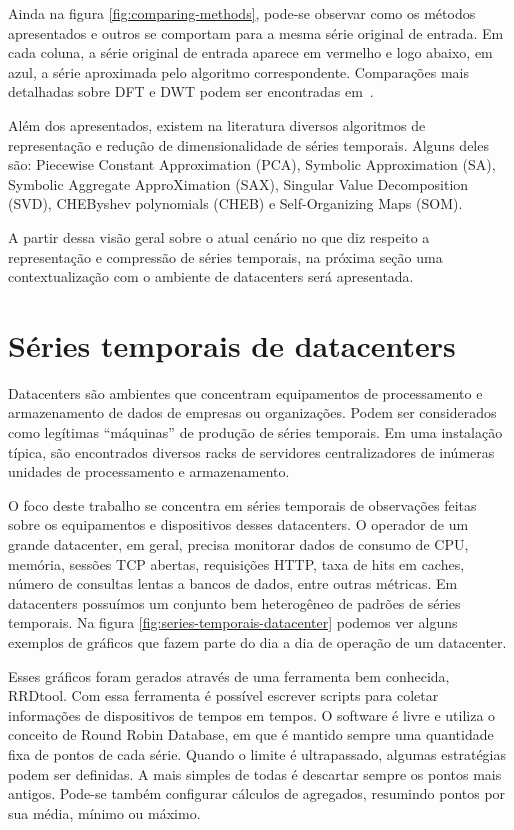 Ainda na figura \ref{fig:comparing-methods}, pode-se observar como os métodos apresentados e outros se comportam para a mesma série original de entrada. Em cada coluna, a série original de entrada aparece em vermelho e logo abaixo, em azul, a série aproximada pelo algoritmo correspondente. Comparações mais detalhadas sobre DFT e DWT podem ser encontradas em~\cite{dftandwavelets}.

Além dos apresentados, existem na literatura diversos algoritmos de representação e redução de dimensionalidade de séries temporais. Alguns deles são: Piecewise Constant Approximation (PCA), Symbolic Approximation (SA), Symbolic Aggregate ApproXimation (SAX), Singular Value Decomposition (SVD), CHEByshev polynomials (CHEB) e Self-Organizing Maps (SOM).

A partir dessa visão geral sobre o atual cenário no que diz respeito a representação e compressão de séries temporais, na próxima seção uma contextualização com o ambiente de datacenters será apresentada.

\section{Séries temporais de datacenters}
\label{sec:time-series-datacenter}
Datacenters são ambientes que concentram equipamentos de processamento e armazenamento de dados de empresas ou organizações. Podem ser considerados como legítimas ``máquinas'' de produção de séries temporais. Em uma instalação típica, são encontrados diversos racks de servidores centralizadores de inúmeras unidades de processamento e armazenamento.

O foco deste trabalho se concentra em séries temporais de observações feitas sobre os equipamentos e dispositivos desses datacenters. O operador de um grande datacenter, em geral, precisa monitorar dados de consumo de CPU, memória, sessões TCP abertas, requisições HTTP, taxa de hits em caches, número de consultas lentas a bancos de dados, entre outras métricas. Em datacenters possuímos um conjunto bem heterogêneo de padrões de séries temporais. Na figura \ref{fig:series-temporais-datacenter} podemos ver alguns exemplos de gráficos que fazem parte do dia a dia de operação de um datacenter. 

Esses gráficos foram gerados através de uma ferramenta bem conhecida, RRDtool. Com essa ferramenta é possível escrever scripts para coletar informações de dispositivos de tempos em tempos. O software é livre e utiliza o conceito de Round Robin Database, em que é mantido sempre uma quantidade fixa de pontos de cada série. Quando o limite é ultrapassado, algumas estratégias podem ser definidas. A mais simples de todas é descartar sempre os pontos mais antigos. Pode-se também configurar cálculos de agregados, resumindo pontos por sua média, mínimo ou máximo. 

